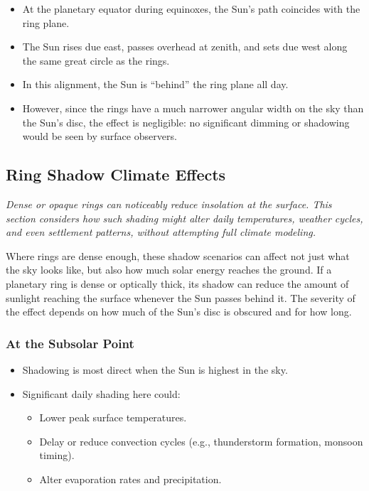 \documentclass[
  letterpaper,
]{book}
\providecommand{\tightlist}{%
  \setlength{\itemsep}{0pt}\setlength{\parskip}{0pt}}
\begin{document}
\begin{itemize}
\tightlist
\item
  At the planetary equator during equinoxes, the Sun's path coincides
  with the ring plane.\\
\item
  The Sun rises due east, passes overhead at zenith, and sets due west
  along the same great circle as the rings.\\
\item
  In this alignment, the Sun is ``behind'' the ring plane all day.\\
\item
  However, since the rings have a much narrower angular width on the sky
  than the Sun's disc, the effect is negligible: no significant dimming
  or shadowing would be seen by surface observers.
\end{itemize}

\subsection{\texorpdfstring{\textbf{Ring Shadow Climate
Effects}}{Ring Shadow Climate Effects}}\label{ring-shadow-climate-effects}

\emph{Dense or opaque rings can noticeably reduce insolation at the
surface. This section considers how such shading might alter daily
temperatures, weather cycles, and even settlement patterns, without
attempting full climate modeling.}

Where rings are dense enough, these shadow scenarios can affect not just
what the sky looks like, but also how much solar energy reaches the
ground. If a planetary ring is dense or optically thick, its shadow can
reduce the amount of sunlight reaching the surface whenever the Sun
passes behind it. The severity of the effect depends on how much of the
Sun's disc is obscured and for how long.

\subsubsection{\texorpdfstring{\textbf{At the Subsolar
Point}}{At the Subsolar Point}}\label{at-the-subsolar-point}

\begin{itemize}
\tightlist
\item
  Shadowing is most direct when the Sun is highest in the sky.\\
\item
  Significant daily shading here could:

  \begin{itemize}
  \tightlist
  \item
    Lower peak surface temperatures.\\
  \item
    Delay or reduce convection cycles (e.g., thunderstorm formation,
    monsoon timing).\\
  \item
    Alter evaporation rates and precipitation.
  \end{itemize}
\end{itemize}
\end{document}
